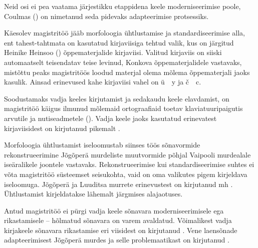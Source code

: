 \documentclass[12pt,a4paper]{article}
\begin{document}
Neid osi ei pea vaatama järjestikku etappidena keele moderniseerimise poole, Coulmas (\citeyear{coulmas_language_1989}) on nimetanud seda pidevaks adapteerimise protsessiks.

Käesolev magistritöö jääb morfoloogia ühtlustamise ja standardiseerimise alla, ent tahest-tahtmata on kasutatud kirjaviisiga tehtud valik, kus on järgitud Heinike Heinsoo (\citeyear{heinsoo_vadsonakopittoja_2015}) õppematerjalide kirjaviisi. Valitud kirjaviis on siiski automaatselt teisendatav teise levinud, Konkova õppematerjalidele vastavaks, mis\-tõttu peaks magistri\-töös loodud materjal olema mõlema õppematerjali jaoks kasulik. Ainsad erinevused kahe kirja\-viisi vahel on ü~\textrightarrow~y ja č~\textrightarrow~c. %

Soodustamaks vadja keeles kirjutamist ja sedakaudu keele elavdamist, on magistritöö käigus ilmunud mõlemaid ortograafiaid toetav klaviatuuri\-paigutis arvutile ja nuti\-seadmetele (\cite{kankainen_annõmmõ_2019}). Vadja keele jaoks kasutatud erinevatest kirjaviisidest on kirjutanud pikemalt \cite{ernits_vadja_2010}.

Morfoloogia ühtlustamist iseloomustab siinses töös sõnavormide rekonstrueerimine Jõgõperä murdeliste muutvormide põhjal Vaipooli murdealale iseäralikele joontele vastavaks. Rekonstrueerimise kui standardiseerimise suhtes ei võta magistri\-töö süsteemset seisukohta, vaid on oma valikutes pigem kirjeldava iseloomuga. Jõgõperä ja Luuditsa murrete erinevustest on kirjutanud mh \cite{rozhanskiy_dialectal_2015}. Ühtlustamist kirjeldatakse lähemalt järgmises alajaotuses.

Antud magistritöö ei pürgi vadja keele sõnavara moderniseerimisele ega rikastamisele -- hõlmatud sõnavara on varem avaldatud. Võimalikest vadja kirja\-keele sõnavara rikastamise eri viisidest on kirjutanud \cite{ernits_vadja_2010}. 
Vene laensõnade adapteerimisest Jõgõperä murdes ja selle problemaatikast on kirjutanud \cite{rozhanskiy_zaimstvovannyje_2009}.

\end{document}
